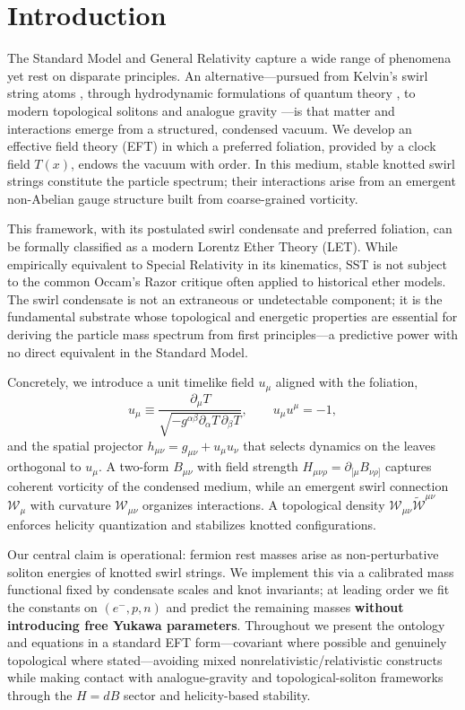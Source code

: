\section{Introduction}

The Standard Model and General Relativity capture a wide range of phenomena yet rest on disparate principles. An alternative—pursued from Kelvin’s swirl string atoms \cite{Kelvin1867}, through hydrodynamic formulations of quantum theory \cite{Madelung1927}, to modern topological solitons and analogue gravity \cite{Faddeev1997,Arnold1998,Barcelo2011,Volovik2003,Kleckner2013}—is that matter and interactions emerge from a structured, condensed vacuum. We develop an effective field theory (EFT) in which a preferred foliation, provided by a clock field \(T(x)\), endows the vacuum with order. In this medium, stable knotted swirl strings constitute the particle spectrum; their interactions arise from an emergent non-Abelian gauge structure built from coarse-grained vorticity.


This framework, with its postulated swirl condensate and preferred foliation, can be formally classified as a modern Lorentz Ether Theory (LET). While empirically equivalent to Special Relativity in its kinematics, SST is not subject to the common Occam's Razor critique often applied to historical ether models. The swirl condensate is not an extraneous or undetectable component; it is the fundamental substrate whose topological and energetic properties are essential for deriving the particle mass spectrum from first principles—a predictive power with no direct equivalent in the Standard Model.

Concretely, we introduce a unit timelike field \(u_\mu\) aligned with the foliation,
\[
 u_\mu \equiv \frac{\partial_\mu T}{\sqrt{-g^{\alpha\beta}\partial_\alpha T\,\partial_\beta T}},
 \qquad u_\mu u^\mu = -1,
\]
and the spatial projector \(h_{\mu\nu}=g_{\mu\nu}+u_\mu u_\nu\) that selects dynamics on the leaves orthogonal to \(u_\mu\). A two-form \(B_{\mu\nu}\) with field strength \(H_{\mu\nu\rho}=\partial_{[\mu}B_{\nu\rho]}\) captures coherent vorticity of the condensed medium, while an emergent swirl connection \(\mathcal{W}_\mu\) with curvature \(\mathcal{W}_{\mu\nu}\) organizes interactions. A topological density \(\mathcal{W}_{\mu\nu}\tilde{\mathcal{W}}^{\mu\nu}\) enforces helicity quantization and stabilizes knotted configurations.

Our central claim is operational: fermion rest masses arise as non-perturbative soliton energies of knotted swirl strings. We implement this via a calibrated mass functional fixed by condensate scales and knot invariants; at leading order we fit the constants on \((e^-,p,n)\) and predict the remaining masses \textbf{without introducing free Yukawa parameters}. Throughout we present the ontology and equations in a standard EFT form—covariant where possible and genuinely topological where stated—avoiding mixed nonrelativistic/relativistic constructs while making contact with analogue-gravity and topological-soliton frameworks through the \(H=dB\) sector and helicity-based stability.


